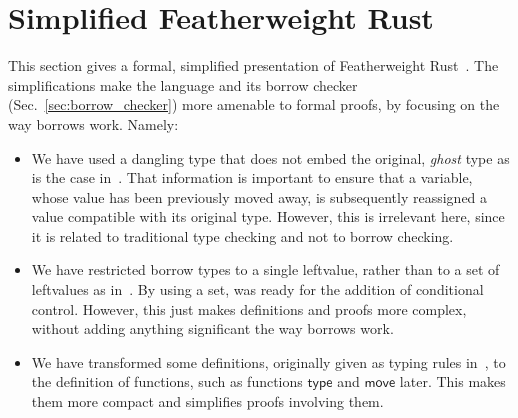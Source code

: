 \section{Simplified Featherweight Rust}\label{sec:featherweight}

This section gives a formal, simplified presentation of Featherweight
Rust~\cite{Pearce21}. The simplifications make the language and its
borrow checker (Sec.~\ref{sec:borrow_checker})
more amenable to formal proofs, by focusing on the way borrows work. Namely:
%
\begin{itemize}
\item We have used a dangling type that does not embed the
  original, \emph{ghost} type as is the case in~\cite{Pearce21}.
  That information is important to ensure that a variable, whose value has been
  previously moved away, is subsequently reassigned a value compatible
  with its original type. However, this is irrelevant here,
  since it is related to traditional type checking and not to borrow checking.
\item We have restricted borrow types to a single leftvalue, rather than to a set of
  leftvalues as in~\cite{Pearce21}. By using a set, \cite{Pearce21}
  was ready for the addition of conditional control. However, this just makes definitions
  and proofs more complex, without adding anything significant \wrt the way borrows work.
\item We have transformed some definitions, originally given as typing rules in~\cite{Pearce21},
  to the definition of functions, such as functions $\mathsf{type}$ and $\mathsf{move}$ later.
  This makes them more compact and simplifies proofs involving them.
\end{itemize}

